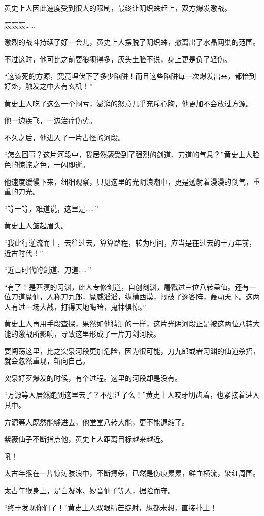 \begin{this_body}
黄史上人因此速度受到很大的限制，最终让阴织蛛赶上，双方爆发激战。

轰轰轰……

激烈的战斗持续了好一会儿，黄史上人摆脱了阴织蛛，撤离出了水晶网巢的范围。

不过这时，他可比之前要狼狈得多，灰头土脸不说，身上更是负了轻伤。

“这该死的方源，究竟埋伏下了多少陷阱！而且这些陷阱每一次爆发出来，都恰到好处，触发之中大有玄机！”

黄史上人吃了这么一个闷亏，澎湃的怒意几乎充斥心胸，他更加不会放过方源。

他一边疾飞，一边治疗伤势。

不久之后，他进入了一片古怪的河段。

“怎么回事？这片河段中，我居然感受到了强烈的剑道、刀道的气息？”黄史上人脸色的惊诧之色，一闪即逝。

他速度缓慢下来，细细观察，只见这里的光阴浪潮中，更是透射着漫漫的剑气，重重的刀光。

“等一等，难道说，这里是……”

黄史上人皱起眉头。

“我此行逆流而上，去往过去，算算路程，转为时间，应当是在过去的十万年前，近古时代！”

“近古时代的剑道、刀道……”

“有了！是西漠的习渊，此人专修剑道，自创剑渊，屠戮过三位八转蛊仙。还有一位刀道魔仙，人称刀九郎，魔威滔滔，纵横西漠，闯破了逐客阵，轰动天下。这两人有过一场大战，打得天地晦暗，鬼神惧惊。”

黄史上人再用手段查探，果然如他猜测的一样，这片光阴河段正是被这两位八转大能的激战所影响，导致这里形成了一片刀剑河段。

要闯荡这里，比之突泉河段更加危险，因为很可能，刀九郎或者习渊的仙道杀招，就会忽然重现，斩向自己。

突泉好歹爆发的时候，有个过程。这里的河段却是没有。

“方源等人居然跑到这里去了？不想活了么！”黄史上人咬牙切齿着，也紧接着进入其中。

方源等人既然能够进去，他堂堂八转大能，更不能退缩了。

紫薇仙子不断指点他，黄史上人距离目标越来越近。

吼！

太古年猴在一片惊涛骇浪中，不断搏杀，已然是伤痕累累，鲜血横流，染红周围。

太古年猴身上，是白凝冰、妙音仙子等人，据险而守。

“终于发现你们了！”黄史上人双眼精芒绽射，想都未想，直接扑上！

\end{this_body}

